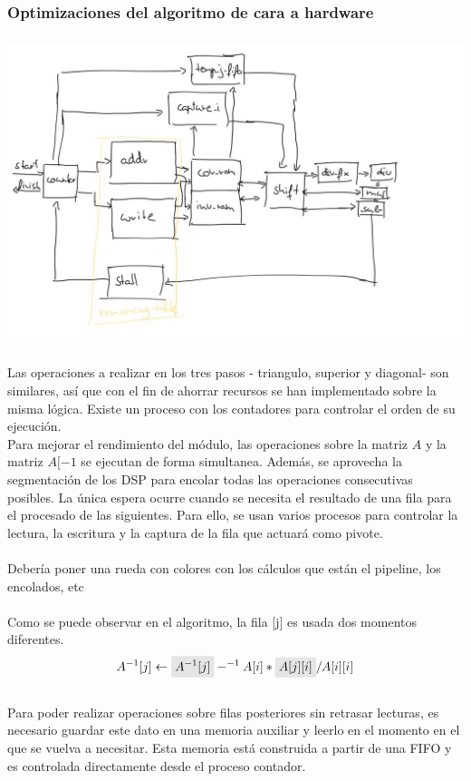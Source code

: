 \subsubsection{Optimizaciones del algoritmo de cara a hardware}
\includegraphics[height=3.5in]{figures/gauss.jpg}
\\
\\
Las operaciones a realizar en los tres pasos - triangulo, superior y diagonal- son similares, así que con el fin de ahorrar recursos se han implementado sobre la misma lógica. Existe un proceso con los contadores para controlar el orden de su ejecución.
\\
Para mejorar el rendimiento del módulo, las operaciones sobre la matriz $A$ y la matriz $A[{-1}$ se ejecutan de forma simultanea. Además, se aprovecha la segmentación de los DSP para encolar todas las operaciones consecutivas posibles. La única espera ocurre cuando se necesita el resultado de una fila para el procesado de las siguientes. Para ello, se usan varios procesos para controlar la lectura, la escritura y la captura de la fila que actuará como pivote.
\\
\\
Debería poner una rueda con colores con los cálculos que están el pipeline, los encolados, etc
\\
\\
\newcommand{\highlight}[1]{%
  \colorbox{gray!20}{$\displaystyle#1$}}
Como se puede observar en el algoritmo, la fila [j] es usada dos momentos diferentes.
\[A^{-1}[j] \gets \highlight{A^{-1}[j]}-^{-1}A[i]*\highlight{A[j][i]}/A[i][i]\]
\\
Para poder realizar operaciones sobre filas posteriores sin retrasar lecturas, es necesario guardar este dato en una memoria auxiliar y leerlo en el momento en el que se vuelva a necesitar. Esta memoria está construida a partir de una FIFO y es controlada directamente desde el proceso contador.
